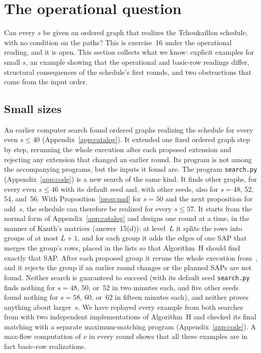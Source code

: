 \section{The operational question}
\label{sec:operational}

Can every $s$ be given an ordered graph that realizes the Tchoukaillon
schedule, with no condition on the paths? This is exercise~16 under the
operational reading, and it is open. This section collects what we know:
explicit examples for small $s$, an example showing that the operational
and basic-row readings differ, structural consequences of the
schedule's first rounds, and two obstructions that come from the input
order.

\subsection{Small sizes}
\label{sec:catalog}

An earlier computer search found ordered graphs realizing the schedule for
every even $s\le40$ (Appendix~\ref{app:catalog}). It extended one fixed
ordered graph step by step, rerunning the whole execution after each
proposed extension and rejecting any extension that changed an earlier
round. Its program is not among the accompanying programs, but the inputs
it found are. The program \texttt{search.py} (Appendix~\ref{app:code}) is a
new search of the same kind. It finds other graphs, for every even
$s\le46$ with its default seed and, with other seeds, also for $s=48$, 52,
54, and~56. With Proposition~\ref{prop:pad} for $s=50$ and the next
proposition for odd~$s$, the schedule can therefore be realized for every
$s\le57$. It starts from the normal form of Appendix~\ref{app:catalog} and
designs one round at a time, in the manner of Knuth's matrices
(answer~15(d)): at level~$L$ it splits the rows into groups of at most
$L+1$, and for each group it adds the edges of one SAP that merges the
group's rows, placed in the lists so that Algorithm~H should find exactly
that SAP. After each proposed group it reruns the whole execution
from~, and it rejects the group if an earlier round changes or the
planned SAPs are not found. Neither search is guaranteed to succeed
(with its default seed \texttt{search.py} finds nothing for $s=48$, 50,
or~52 in two minutes each, and five other seeds found nothing for $s=58$, 60,
or~62 in fifteen minutes each), and neither proves anything about
larger~$s$. We have replayed every
example from both searches from  with two independent implementations
of Algorithm~H and checked its final matching with a separate
maximum-matching program (Appendix~\ref{app:code}). A max-flow computation
of $\nu$ in every round shows that all these examples are in fact basic-row
realizations.

